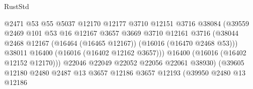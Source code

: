 \begin{lexlean}{RustStd}
\begin{coremodule}
                                            @2471
                                            @53
                                            @55
                                            @5037
                                            @12170
                                            @12177
                                            @3710
                                            @12151
                                            @3716
                                            @38084
                                            (@39559
                                              @2469
                                              @101
                                              @53
                                              @16
                                              @12167
                                              @3657
                                              @3669
                                              @3710
                                              @12161
                                              @3716
                                              (@38044
                                                @2468
                                                @12167
                                                (@16464 (@16465 @12167))
                                                (@16016 (@16470 @2468 @53)))
                                              @38011
                                              @16400
                                              (@16016 (@16402 @12162 @3657)))
                                            @16400
                                            (@16016 (@16402 @12152 @12170)))
                                          @22046
                                          @22049
                                          @22052
                                          @22056
                                          @22061
                                          @38930)
                                        (@39605
                                          @12180
                                          @2480
                                          @2487
                                          @13
                                          @3657
                                          @12186
                                          @3657
                                          @12193
                                          (@39950
                                            @2480
                                            @13
                                            @12186

\end{coremodule}
\end{lexlean}
